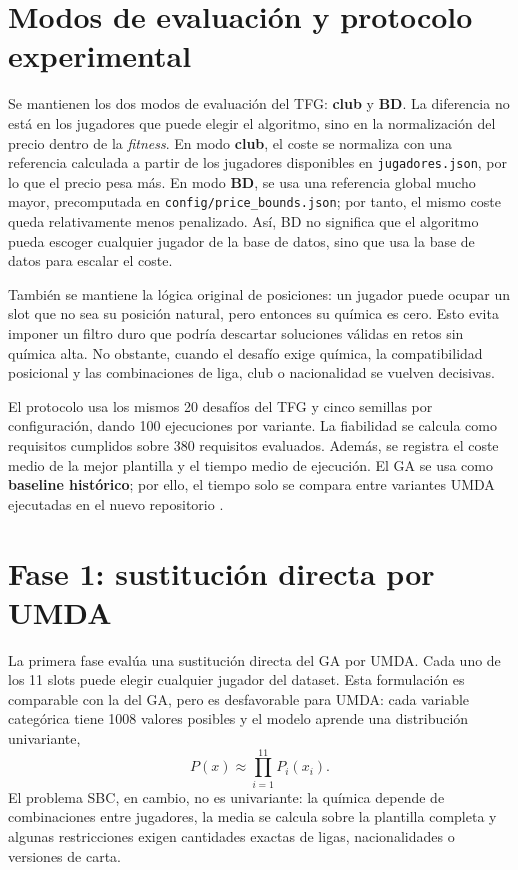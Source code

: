 \documentclass[10pt,a4paper]{article}
\begin{document}
\section{Modos de evaluación y protocolo experimental}

Se mantienen los dos modos de evaluación del TFG: \textbf{club} y \textbf{BD}. La diferencia no está en los jugadores que puede elegir el algoritmo, sino en la normalización del precio dentro de la \textit{fitness}. En modo \textbf{club}, el coste se normaliza con una referencia calculada a partir de los jugadores disponibles en \texttt{jugadores.json}, por lo que el precio pesa más. En modo \textbf{BD}, se usa una referencia global mucho mayor, precomputada en \texttt{config/price\_bounds.json}; por tanto, el mismo coste queda relativamente menos penalizado. Así, BD no significa que el algoritmo pueda escoger cualquier jugador de la base de datos, sino que usa la base de datos para escalar el coste.

También se mantiene la lógica original de posiciones: un jugador puede ocupar un slot que no sea su posición natural, pero entonces su química es cero. Esto evita imponer un filtro duro que podría descartar soluciones válidas en retos sin química alta. No obstante, cuando el desafío exige química, la compatibilidad posicional y las combinaciones de liga, club o nacionalidad se vuelven decisivas.

El protocolo usa los mismos 20 desafíos del TFG y cinco semillas por configuración, dando 100 ejecuciones por variante. La fiabilidad se calcula como requisitos cumplidos sobre 380 requisitos evaluados. Además, se registra el coste medio de la mejor plantilla y el tiempo medio de ejecución. El GA se usa como \textbf{baseline histórico}; por ello, el tiempo solo se compara entre variantes UMDA ejecutadas en el nuevo repositorio \cite{repo}.

\section{Fase 1: sustitución directa por UMDA}

La primera fase evalúa una sustitución directa del GA por UMDA. Cada uno de los 11 slots puede elegir cualquier jugador del dataset. Esta formulación es comparable con la del GA, pero es desfavorable para UMDA: cada variable categórica tiene 1008 valores posibles y el modelo aprende una distribución univariante,
\[
    P(x) \approx \prod_{i=1}^{11}P_i(x_i).
\]
El problema SBC, en cambio, no es univariante: la química depende de combinaciones entre jugadores, la media se calcula sobre la plantilla completa y algunas restricciones exigen cantidades exactas de ligas, nacionalidades o versiones de carta.
\end{document}

